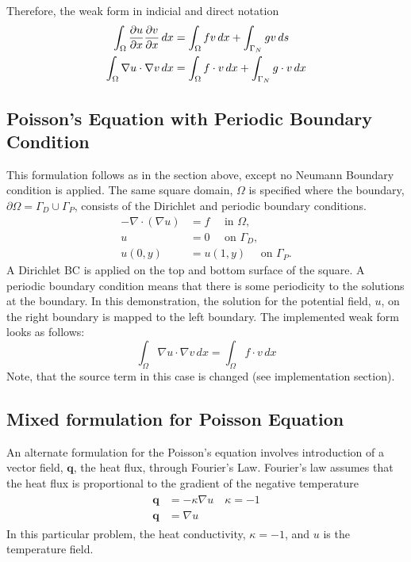 \documentclass[12pt,3p]{article}
\begin{document}
Therefore, the weak form in indicial and direct notation
\begin{subequations}\label{EqWeakForm}
\begin{align}
\int_{\Omega} \pdv{u}{x} \pdv{v}{x} \, d{x}  
	&= \int_{\Omega} f v \, d{x}  + \int_{\Gamma_N}  g v \, d {s} \\
\int_{\Omega} \nabla u \cdot \nabla v \, d{x} 
	&= \int_{\Omega} f \cdot v \, d{x} + \int_{\Gamma_N} g \cdot v \, d{x} 
\end{align}
\end{subequations}

\subsection{Poisson's Equation with Periodic Boundary Condition}
This formulation follows as in the section above, except no Neumann Boundary condition is applied. The same square domain, $\Omega$ is specified where the boundary, $\partial \Omega=\Gamma_D \cup \Gamma_P$, consists of the Dirichlet and periodic boundary conditions. 
\begin{subequations}\label{EqStrongFormPBC}
\begin{align}
-\nabla \cdot(\nabla u) & =f \quad \text { in } \Omega, \\
u & =0 \quad \text { on } \Gamma_D, \\
u(0, y) & =u(1, y) \quad \text { on } \Gamma_P .
\end{align}
\end{subequations}
A Dirichlet BC is applied on the top and bottom surface of the square. A periodic boundary condition means that there is some periodicity to the solutions at the boundary. In this demonstration, the solution for the potential field, $u$, on the right boundary is mapped to the left boundary. The implemented weak form looks as follows:
\begin{equation}\label{EqWeakFormWoNeumann}
\int_{\Omega} \nabla u \cdot \nabla v \, d{x} = \int_{\Omega} f \cdot v \, d{x} 
\end{equation}
Note, that the source term in this case is changed (see implementation section). 


\subsection{Mixed formulation for Poisson Equation}
\vspace{-1ex}
An alternate formulation for the Poisson's equation involves introduction of a vector field, $\mathbf{q}$, the heat flux, through Fourier's Law. Fourier's law assumes that the heat flux is proportional to the gradient of the negative temperature
\begin{align}\label{EqFourierLaw}
\begin{split}
\bm{q} &= - \kappa \nabla u \quad \kappa = -1 \\
\bm{q} &= \nabla u 
\end{split}
\end{align}
In this particular problem, the heat conductivity, $\kappa= -1$,  and $u$ is the temperature field. 
\end{document}
